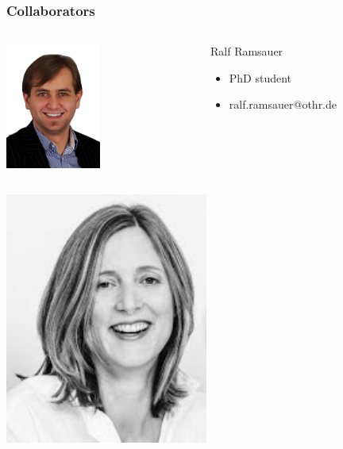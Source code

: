 \documentclass[9pt]{beamer}
\begin{document}
	\begin{frame}
	\frametitle{Collaborators}
	\begin{minipage}[c]{1.0\linewidth}
		\begin{columns}
		\begin{column}{0.35\textwidth}
			\begin{center}
     		\includegraphics[width=0.5\textwidth]{pics/speakers_ralf.png}
			\end{center}
		\end{column}
		\begin{column}{0.7\textwidth}
		\begin{block}{Ralf Ramsauer}
			\begin{itemize}
				\item PhD student
				\item ralf.ramsauer@othr.de
			\end{itemize}
		\end{block}
		\end{column}
		\end{columns}
	\end{minipage}
	\begin{minipage}[c]{1.0\linewidth}
		\begin{columns}
		\begin{column}{0.35\textwidth}
			\begin{center}
     		\includegraphics[width=0.5\textwidth]{pics/speakers_scherzinger.jpeg}

\end{center}
\end{column}
\end{columns}
\end{minipage}
\end{frame}
\end{document}
